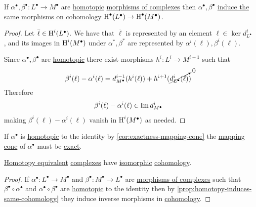 \documentclass[../../../main]{subfiles}
\begin{document}
\begin{proposition} \label{prop:homotopy-induces-same-cohomology}
  If \(\alpha^{\bullet}, \beta^{\bullet}: L^{\bullet} \to M^{\bullet}\) are \hyperref[def:homotopy]{homotopic} \hyperref[def:complex-morphism]{morphisms of complexes} then \(\alpha^{\bullet}, \beta^{\bullet}\) \hyperref[thm:LES-in-cohomology]{induce the same morphisms on cohomology} \(\operatorname{H}^{\bullet}(L^{\bullet}) \to \operatorname{H}^{\bullet}(M^{\bullet})\).
\end{proposition}
\begin{proof}
  Let \(\overline{\ell} \in \operatorname{H}^{i}(L^{\bullet})\).
  We have that \(\overline{\ell}\) is represented by an element \(\ell \in \ker d_{L^{\bullet}}^{i}\), and its images in \(\operatorname{H}^{i}(M^{\bullet})\) under \(\alpha^{\ast}, \beta^{\ast}\) are represented by \(\alpha^{i}(\ell), \beta^{i}(\ell)\).

  Since \(\alpha^{\bullet}, \beta^{\bullet}\) are \hyperref[def:homotopy]{homotopic} there exist morphisms \(h^{i}: L^{i} \to M^{i-1}\) such that
  \begin{align*}
    \beta^{i}(\ell) - \alpha^{i}(\ell) = d_{M^{\bullet}}^{i-1}(h^{i}(\ell)) + h^{i+1}(\cancelto{0}{d_{L^{\bullet}}^{i}(\ell)})
  \end{align*}
  Therefore
  \begin{align*}
    \beta^{i}(\ell) - \alpha^{i}(\ell) \in \operatorname*{Im} d_{M^{\bullet}}^{i}
  \end{align*}
  making \(\beta^{i}(\ell) - \alpha^{i}(\ell)\) vanish in \(\operatorname{H}^{i}(M^{\bullet})\) as needed.
\end{proof}

\begin{remark}
  If \(\alpha^{\bullet}\) is \hyperref[def:homotopy]{homotopic} to the identity by \autoref{cor:exactness-mapping-cone} the \hyperref[def:mapping-cone]{mapping cone} of \(\alpha^{\bullet}\) must be \hyperref[def:exact-complex]{exact}.
\end{remark}

\begin{corollary}\label{cor:homotopy-equivalent-isomorphic-cohomology}
  \hyperref[def:homotopy-equivalence]{Homotopy equivalent} \hyperref[def:complex]{complexes} have \hyperref[def:categorical-isomorphism]{isomorphic} \hyperref[def:cohomology]{cohomology}.
\end{corollary}
\begin{proof}
  If \(\alpha^{\bullet}: L^{\bullet} \to M^{\bullet}\) and \(\beta^{\bullet}: M^{\bullet} \to L^{\bullet}\) are \hyperref[def:complex-morphism]{morphisms of complexes} such that \(\beta^{\bullet} \circ \alpha^{\bullet}\) and \(\alpha^{\bullet} \circ \beta^{\bullet}\) are \hyperref[def:homotopy]{homotopic} to the identity then by \autoref{prop:homotopy-induces-same-cohomology} they induce inverse morphisms in \hyperref[def:cohomology]{cohomology}.
\end{proof}
\end{document}
